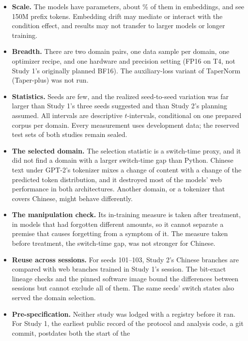 \documentclass[11pt]{article}
\begin{document}
\begin{itemize}[leftmargin=1.4em,itemsep=2pt]
  \item \textbf{Scale.} The models have \paramsRMS{} parameters, about \embedShare\% of them in embeddings, and see
        150M prefix tokens. Embedding drift may mediate or interact with the condition effect, and results may
        not transfer to larger models or longer training.
  \item \textbf{Breadth.} There are two domain pairs, one data sample per domain, one optimizer recipe, and one
        hardware and precision setting (FP16 on T4, not Study 1's originally planned BF16). The auxiliary-loss
        variant of TaperNorm (Taper-plus) was not run.
  \item \textbf{Statistics.} Seeds are few, and the realized seed-to-seed variation was far larger than Study 1's
        three seeds suggested and than Study 2's planning assumed. All intervals are descriptive $t$-intervals,
        conditional on one prepared corpus per domain. Every measurement uses development data; the reserved test
        sets of both studies remain sealed.
  \item \textbf{The selected domain.} The selection statistic is a switch-time proxy, and it did not find a domain
        with a larger switch-time gap than Python. Chinese text under GPT-2's tokenizer mixes a change of content
        with a change of the predicted token distribution, and it destroyed most of the models' web performance in
        both architectures. Another domain, or a tokenizer that covers Chinese, might behave differently.
  \item \textbf{The manipulation check.} Its in-training measure is taken after treatment, in models that had
        forgotten different amounts, so it cannot separate a premise that causes forgetting from a symptom of it.
        The measure taken before treatment, the switch-time gap, was not stronger for Chinese.
  \item \textbf{Reuse across sessions.} For seeds 101--103, Study 2's Chinese branches are compared with web
        branches trained in Study 1's session. The bit-exact lineage checks and the pinned software image bound
        the differences between sessions but cannot exclude all of them. The same seeds' switch states also served
        the domain selection.
  \item \textbf{Pre-specification.} Neither study was lodged with a registry before it ran. For Study 1, the
        earliest public record of the protocol and analysis code, a git commit, postdates both the start of the

\end{itemize}
\end{document}
